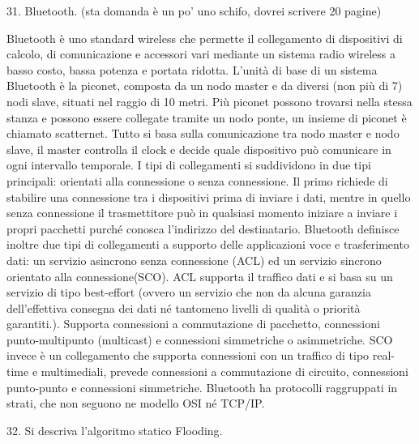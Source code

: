 31.	Bluetooth. (sta domanda è un po’ uno schifo, dovrei scrivere 20 pagine)

Bluetooth è uno standard wireless che permette il collegamento di dispositivi di calcolo, di comunicazione e accessori vari mediante un sistema radio wireless a basso costo, bassa potenza e portata ridotta.
L’unità di base di un sistema Bluetooth è la piconet, composta da un nodo master e da diversi (non più di 7) nodi slave, situati nel raggio di 10 metri. Più piconet possono trovarsi nella stessa stanza e possono essere collegate tramite un nodo ponte, un insieme di piconet è chiamato scatternet.
Tutto si basa sulla comunicazione tra nodo master e nodo slave, il master controlla il clock e decide quale dispositivo può comunicare in ogni intervallo temporale.
I tipi di collegamenti si suddividono in due tipi principali: orientati alla connessione o senza connessione.
Il primo richiede di stabilire una connessione tra i dispositivi prima di inviare i dati, mentre in quello senza connessione il trasmettitore può in qualsiasi momento iniziare a inviare i propri pacchetti purché conosca l’indirizzo del destinatario.
Bluetooth definisce inoltre due tipi di collegamenti a supporto delle applicazioni voce e trasferimento dati: un servizio asincrono senza connessione (ACL) ed un servizio sincrono orientato alla connessione(SCO).
ACL supporta il traffico dati e si basa su un servizio di tipo best-effort (ovvero un servizio che non da alcuna garanzia dell’effettiva consegna dei dati né tantomeno livelli di qualità o priorità garantiti.).
Supporta connessioni a commutazione di pacchetto, connessioni punto-multipunto (multicast) e connessioni simmetriche o asimmetriche.
SCO invece è un collegamento che supporta connessioni con un traffico di tipo real-time e multimediali, prevede connessioni a commutazione di circuito, connessioni punto-punto e connessioni simmetriche.
Bluetooth ha protocolli raggruppati in strati, che non seguono ne modello OSI né TCP/IP.

32.	Si descriva l’algoritmo statico Flooding.

